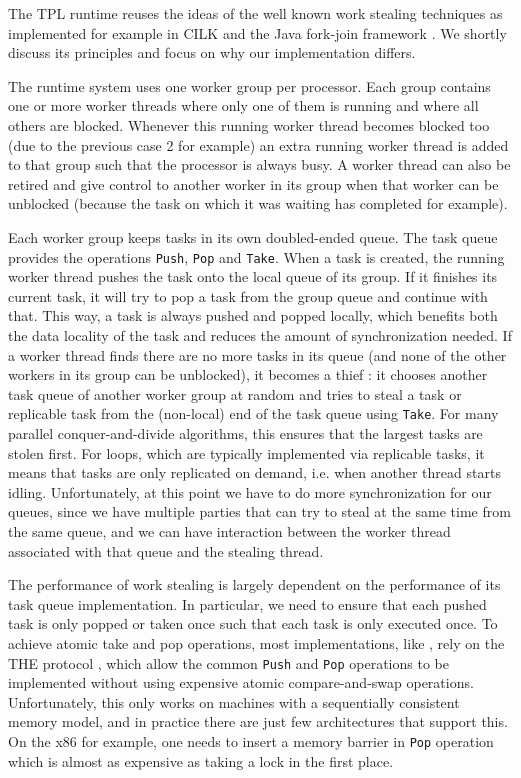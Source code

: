 
The TPL runtime reuses the ideas of the well known work stealing
techniques as implemented for example in CILK \cite{Frigo1998,
  Danaher2005} and the Java fork-join framework \cite{Lea2000,
  Lea2000a, Lea2004, Lea2006}. We shortly discuss its principles and
focus on why our implementation differs.

The runtime system uses one worker group per processor. Each group
contains one or more worker threads where only one of them is running
and where all others are blocked. Whenever this running worker thread
becomes blocked too (due to the previous case 2 for example) an extra
running worker thread is added to that group such that the processor
is always busy. A worker thread can also be retired and give control
to another worker in its group when that worker can be unblocked
(because the task on which it was waiting has completed for example).

Each worker group keeps tasks in its own doubled-ended queue. The task
queue provides the operations \lstinline!Push!, \lstinline!Pop! and
\lstinline!Take!. When a task is created, the running worker thread
pushes the task onto the local queue of its group. If it finishes its
current task, it will try to pop a task from the group queue and
continue with that. This way, a task is always pushed and popped
locally, which benefits both the data locality of the task and reduces
the amount of synchronization needed. If a worker thread finds there
are no more tasks in its queue (and none of the other workers in its
group can be unblocked), it becomes a thief : it chooses another task
queue of another worker group at random and tries to steal a task or
replicable task from the (non-local) end of the task queue using
\lstinline!Take!. For many parallel conquer-and-divide algorithms,
this ensures that the largest tasks are stolen first. For loops,
which are typically implemented via replicable tasks, it means that
tasks are only replicated on demand, i.e. when another thread starts
idling. Unfortunately, at this point we have to do more
synchronization for our queues, since we have multiple parties that
can try to steal at the same time from the same queue, and we can have
interaction between the worker thread associated with that queue and
the stealing thread.

The performance of work stealing is largely dependent on the
performance of its task queue implementation. In particular, we need
to ensure that each pushed task is only popped or taken once such that
each task is only executed once. To achieve atomic take and pop
operations, most implementations, like \cite{Arora2001}, rely on the
THE protocol \cite{Dijkstra1965}, which allow the common
\lstinline!Push! and \lstinline!Pop! operations to be implemented
without using expensive atomic compare-and-swap
operations. Unfortunately, this only works on machines with a
sequentially consistent memory model, and in practice there are just
few architectures that support this. On the x86 for example, one needs
to insert a memory barrier in \lstinline!Pop! operation which is
almost as expensive as taking a lock in the first place.

